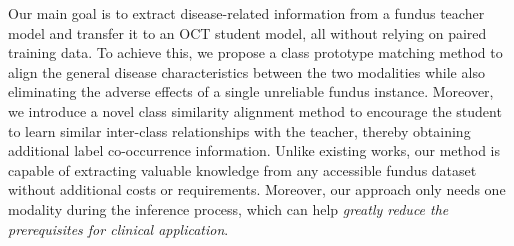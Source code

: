 \documentclass[runningheads]{llncs}
\newcommand{\wdai}[1]{{\color[rgb]{0.9,0.1,0.1}{#1}}}
\begin{document}
Our main goal is to extract disease-related information from a fundus teacher model and transfer it to an OCT student model, all without relying on paired training data. To achieve this, we propose a class prototype matching method to align the general disease characteristics between the two modalities while also eliminating the adverse effects of a single unreliable fundus instance.
Moreover, we introduce a novel class similarity alignment method to encourage the student to learn similar inter-class relationships with the teacher, thereby obtaining additional label co-occurrence information. Unlike existing works, our method is capable of extracting valuable knowledge from any accessible fundus dataset without additional costs or requirements. Moreover, our approach only needs one modality during the inference process, which can help \textit{greatly reduce the prerequisites for clinical application}.


\end{document}
